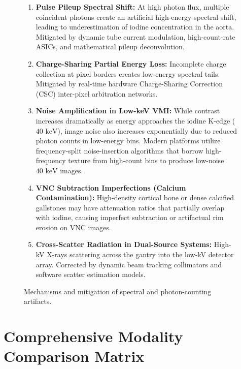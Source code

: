 \documentclass[11pt,a4paper]{article}
\begin{document}
\begin{figure}[htbp]
\centering
\begin{tcolorbox}[colback=purple!5!white,colframe=purple!60!black,title=\textbf{Artifact Taxonomy and Corrective Strategies in Spectral CT},width=\linewidth]
\small
\begin{enumerate}[leftmargin=1.5em]
    \item \textbf{Pulse Pileup Spectral Shift:} At high photon flux, multiple coincident photons create an artificial high-energy spectral shift, leading to underestimation of iodine concentration in the aorta. Mitigated by dynamic tube current modulation, high-count-rate ASICs, and mathematical pileup deconvolution.
    \item \textbf{Charge-Sharing Partial Energy Loss:} Incomplete charge collection at pixel borders creates low-energy spectral tails. Mitigated by real-time hardware Charge-Sharing Correction (CSC) inter-pixel arbitration networks.
    \item \textbf{Noise Amplification in Low-keV VMI:} While contrast increases dramatically as energy approaches the iodine K-edge ($40\text{ keV}$), image noise also increases exponentially due to reduced photon counts in low-energy bins. Modern platforms utilize frequency-split noise-insertion algorithms that borrow high-frequency texture from high-count bins to produce low-noise $40\text{ keV}$ images.
    \item \textbf{VNC Subtraction Imperfections (Calcium Contamination):} High-density cortical bone or dense calcified gallstones may have attenuation ratios that partially overlap with iodine, causing imperfect subtraction or artifactual rim erosion on VNC images.
    \item \textbf{Cross-Scatter Radiation in Dual-Source Systems:} High-kV X-rays scattering across the gantry into the low-kV detector array. Corrected by dynamic beam tracking collimators and software scatter estimation models.
\end{enumerate}
\end{tcolorbox}
\caption{Mechanisms and mitigation of spectral and photon-counting artifacts.}
\label{fig:artifacts_taxonomy}
\end{figure}

\section{Comprehensive Modality Comparison Matrix}
\end{document}

